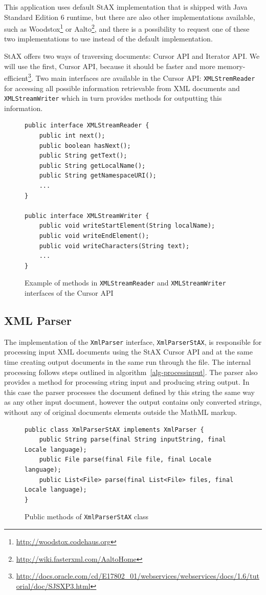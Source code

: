 \documentclass[11pt,oneside,final]{fithesis2}
\begin{document}
This application uses default StAX implementation that is shipped with Java Standard Edition 6 runtime, but there are also other implementations available, such as Woodstox\footnote{\url{http://woodstox.codehaus.org}} or Aalto\footnote{\url{http://wiki.fasterxml.com/AaltoHome}}, and there is a possibility to request one of these two implementations to use instead of the default implementation.

StAX offers two ways of traversing documents: Cursor API and Iterator API. We will use the first, Cursor API, because it should be faster and more memory-efficient\footnote{\url{http://docs.oracle.com/cd/E17802_01/webservices/webservices/docs/1.6/tutorial/doc/SJSXP3.html}}. Two main interfaces are available in the Cursor API: \texttt{XMLStremReader} for accessing all possible information retrievable from XML documents and \texttt{XMLStreamWriter} which in turn provides methods for outputting this information. 

\begin{figure}[!ht]
\begin{lstlisting}
public interface XMLStreamReader {
	public int next();
   	public boolean hasNext();
   	public String getText();		
  	public String getLocalName();
  	public String getNamespaceURI();
  	...
} 

public interface XMLStreamWriter {
  	public void writeStartElement(String localName);
  	public void writeEndElement();
 	public void writeCharacters(String text);
	... 
}
\end{lstlisting}
\caption{Example of methods in \texttt{XMLStreamReader} and \texttt{XMLStreamWriter} interfaces of the Cursor API}
\label{fig:staxcursorapi}
\end{figure}

\subsection{XML Parser}
The implementation of the \texttt{XmlParser} interface, \texttt{XmlParserStAX}, is responsible for processing input XML documents using the StAX Cursor API and at the same time creating output documents in the same run through the file. The internal processing follows steps outlined in algorithm~\vref{alg-processinput}. The parser also provides a method for processing string input and producing string output. In this case the parser processes the document defined by this string the same way as any other input document, however the output contains only converted strings, without any of original documents elements outside the MathML markup.
\begin{figure}[!ht]
\begin{lstlisting}
public class XmlParserStAX implements XmlParser {
	public String parse(final String inputString, final Locale language);
	public File parse(final File file, final Locale language);
	public List<File> parse(final List<File> files, final Locale language);
}
\end{lstlisting}
\caption{Public methods of \texttt{XmlParserStAX} class}
\label{fig:xmlparserstax}
\end{figure}
\end{document}
